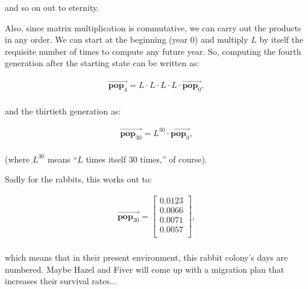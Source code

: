 \vspace{-.15in}

and so on out to eternity.

\smallskip


Also, since matrix multiplication is commutative, we can carry out the products
in any order. We can start at the beginning (year 0) and multiply $L$ by itself
the requisite number of times to compute any future year. So, computing the
fourth generation after the starting state can be written as:

\vspace{-.15in}
\begin{align*}
\overrightarrow{\textbf{pop}_4} = L \cdot L \cdot L \cdot L \cdot
\overrightarrow{\textbf{pop}_0}, \\
\end{align*}
\vspace{-.15in}

and the thirtieth generation as:

\vspace{-.15in}
\begin{align*}
\overrightarrow{\textbf{pop}_{30}} = L^{30} \cdot
\overrightarrow{\textbf{pop}_0},\\
\end{align*}
\vspace{-.15in}

(where $L^{30}$ means ``$L$ times itself 30 times,'' of course).

\medskip

Sadly for the rabbits, this works out to:

\vspace{-.15in}
\begin{align*}
\overrightarrow{\textbf{pop}_{30}} = 
\begin{bmatrix}
0.0123 \\ 0.0066 \\ 0.0071 \\ 0.0057 \\
\end{bmatrix},\\
\end{align*}
\vspace{-.25in}


which means that in their present environment, this rabbit colony's days are
numbered. Maybe Hazel and Fiver will come up with a migration plan that
increases their survival rates...

